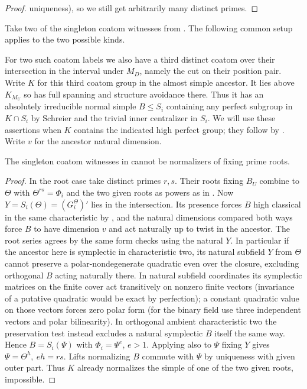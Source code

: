 \begin{proof}
uniqueness), so we still get arbitrarily many distinct primes.

\end{proof}

\begin{remark}\label{fb:protection-third-coatom}
Take two of the singleton coatom witnesses from .
The following common setup applies to the two possible kinds.

For two such coatom labels we also have a third distinct coatom over their intersection in the interval under \(M_D\), namely the cut on their position pair. Write \(K\) for this third coatom group in the almost simple ancestor. It lies above \(K_{M_U}\) so has full spanning and structure avoidance there. Thus it has an absolutely irreducible normal simple \(B\le S_i\) containing any perfect subgroup in \(K\cap S_i\) by Schreier and the trivial inner centralizer in \(S_i\). We will use these assertions when \(K\) contains the indicated high perfect group; they follow by . Write \(v\) for the ancestor natural dimension.

\end{remark}

\begin{lemma}
\label{fb:singleton-roots}
The singleton coatom witnesses in  cannot be
normalizers of fixing prime roots.
\end{lemma}
\begin{proof}

In the root case take distinct primes \(r,s\). Their roots fixing \(B_U\) combine to \(\Theta\) with \(\Theta^{rs}=\Phi_i\) and the two given roots as powers as in . Now \(Y=S_i(\Theta)=(G_i^\Theta)'\) lies in the intersection. Its presence forces \(B\) high classical in the same characteristic by , and the natural dimensions compared both ways force \(B\) to have dimension \(v\) and act naturally up to twist in the ancestor. The root series agrees by the same form checks using the natural \(Y\). In particular if the ancestor here is symplectic in characteristic two, its natural subfield \(Y\) from \(\Theta\) cannot preserve a polar-nondegenerate quadratic even over the closure, excluding orthogonal \(B\) acting naturally there. In natural subfield coordinates its symplectic matrices on the finite cover act transitively on nonzero finite vectors (invariance of a putative quadratic would be exact by perfection); a constant quadratic value on those vectors forces zero polar form (for the binary field use three independent vectors and polar bilinearity). In orthogonal ambient characteristic two the preservation test instead excludes a natural symplectic \(B\) itself the same way. Hence \(B=S_i(\Psi)\) with \(\Phi_i=\Psi^e\), \(e>1\). Applying  also to \(\Psi\) fixing \(Y\) gives \(\Psi=\Theta^h,\ eh=rs\). Lifts normalizing \(B\) commute with \(\Psi\) by uniqueness with given outer part. Thus \(K\) already normalizes the simple of one of the two given roots, impossible.

\end{proof}

